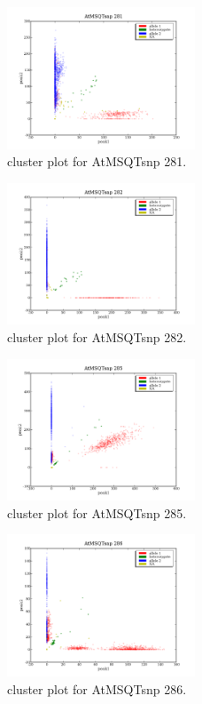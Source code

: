 \begin{figure}[H]
\includegraphics[width=0.5\textwidth]{figures/cluster_plot_AtMSQTsnp_281.png}
\caption{cluster plot for AtMSQTsnp 281.} \label{flAtMSQTsnp281}
\end{figure}
\begin{figure}[H]
\includegraphics[width=0.5\textwidth]{figures/cluster_plot_AtMSQTsnp_282.png}
\caption{cluster plot for AtMSQTsnp 282.} \label{flAtMSQTsnp282}
\end{figure}
\begin{figure}[H]
\includegraphics[width=0.5\textwidth]{figures/cluster_plot_AtMSQTsnp_285.png}
\caption{cluster plot for AtMSQTsnp 285.} \label{flAtMSQTsnp285}
\end{figure}
\begin{figure}[H]
\includegraphics[width=0.5\textwidth]{figures/cluster_plot_AtMSQTsnp_286.png}
\caption{cluster plot for AtMSQTsnp 286.} \label{flAtMSQTsnp286}
\end{figure}
